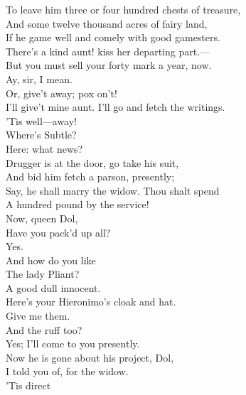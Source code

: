 \documentclass[a4paper,oneside]{memoir}
\begin{document}
\begin{drama*}
To leave him three or four hundred chests of treasure,\\
And some twelve thousand acres of fairy land,\\
If he game well and comely with good gamesters.\\
\subtlespeaks There's a kind aunt! kiss her departing part.---\\
But you must sell your forty mark a year, now.\\
\dapperspeaks Ay, sir, I mean.\\
\subtlespeaks {} Or, give't away; pox on't!\\
\dapperspeaks I'll give't mine aunt. I'll go and fetch the writings.\\
\subtlespeaks 'Tis well---away!\\
\facespeaks {} Where's Subtle?\\
\subtlespeaks {} Here: what news?\\
\facespeaks Drugger is at the door, go take his suit,\\
And bid him fetch a parson, presently;\\
Say, he shall marry the widow. Thou shalt spend\\
A hundred pound by the service!\\
Now, queen Dol,\\
Have you pack'd up all?\\
\dolspeaks {} Yes.\\
\facespeaks {} And how do you like\\
The lady Pliant?\\
\dolspeaks {} A good dull innocent.\\
\subtlespeaks Here's your Hieronimo's cloak and hat.\\
\facespeaks Give me them.\\
\subtlespeaks {} And the ruff too?\\
\facespeaks {} Yes; I'll come to you presently.\\
\subtlespeaks Now he is gone about his project, Dol,\\
I told you of, for the widow.\\
\dolspeaks {} 'Tis direct\\

\end{drama*}
\end{document}
